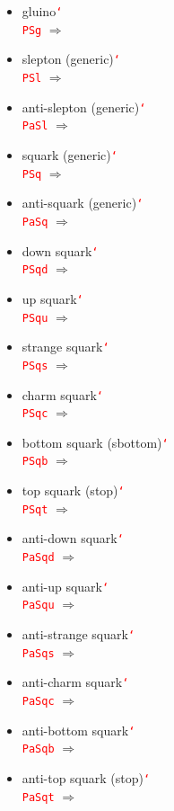 \documentclass[12pt]{article}
\newcommand{\texcmd}[1]{\textcolor{red}{\texttt{\char`\\#1}}}
\begin{document}
\begin{multicols}{2}
{\begin{itemize}
\item gluino\newline \texcmd{PSg} $\Rightarrow$ \PSg
\item slepton (generic)\newline \texcmd{PSl} $\Rightarrow$ \PSl
\item anti-slepton (generic)\newline \texcmd{PaSl} $\Rightarrow$ \PaSl
\item squark (generic)\newline \texcmd{PSq} $\Rightarrow$ \PSq
\item anti-squark (generic)\newline \texcmd{PaSq} $\Rightarrow$ \PaSq
\item down squark\newline \texcmd{PSqd} $\Rightarrow$ \PSqd
\item up squark\newline \texcmd{PSqu} $\Rightarrow$ \PSqu
\item strange squark\newline \texcmd{PSqs} $\Rightarrow$ \PSqs
\item charm squark\newline \texcmd{PSqc} $\Rightarrow$ \PSqc
\item bottom squark (sbottom)\newline \texcmd{PSqb} $\Rightarrow$ \PSqb
\item top squark (stop)\newline \texcmd{PSqt} $\Rightarrow$ \PSqt
\item anti-down squark\newline \texcmd{PaSqd} $\Rightarrow$ \PaSqd
\item anti-up squark\newline \texcmd{PaSqu} $\Rightarrow$ \PaSqu
\item anti-strange squark\newline \texcmd{PaSqs} $\Rightarrow$ \PaSqs
\item anti-charm squark\newline \texcmd{PaSqc} $\Rightarrow$ \PaSqc
\item anti-bottom squark\newline \texcmd{PaSqb} $\Rightarrow$ \PaSqb
\item anti-top squark (stop)\newline \texcmd{PaSqt} $\Rightarrow$ \PaSqt
\end{itemize}
}\end{multicols}
\clearpage
\end{document}
